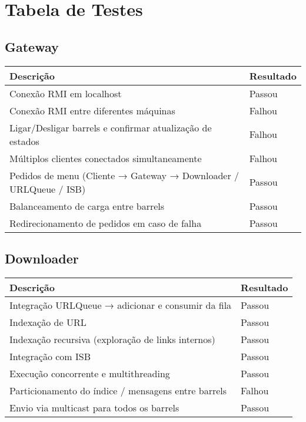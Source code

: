 \documentclass{article}
\begin{document}
\newpage

\newpage
\section{Tabela de Testes}

\subsection{Gateway}

\begin{tabularx}{\textwidth}{X l}
\toprule
\textbf{Descrição} & \textbf{Resultado} \\
\midrule
Conexão RMI em localhost & Passou \\
Conexão RMI entre diferentes máquinas & Falhou \\
Ligar/Desligar barrels e confirmar atualização de estados & Falhou \\
Múltiplos clientes conectados simultaneamente & Falhou \\
Pedidos de menu (Cliente → Gateway → Downloader / URLQueue / ISB) & Passou \\
Balanceamento de carga entre barrels & Passou \\
Redirecionamento de pedidos em caso de falha & Passou \\
\bottomrule
\end{tabularx}

\vspace{1em}
\subsection{Downloader}

\begin{tabularx}{\textwidth}{X l}
\toprule
\textbf{Descrição} & \textbf{Resultado} \\
\midrule
Integração URLQueue → adicionar e consumir da fila & Passou \\
Indexação de URL & Passou \\
Indexação recursiva (exploração de links internos) & Passou \\
Integração com ISB & Passou \\
Execução concorrente e multithreading & Passou \\
Particionamento do índice / mensagens entre barrels & Falhou \\
Envio via multicast para todos os barrels & Passou \\
\bottomrule
\end{tabularx}
\end{document}
